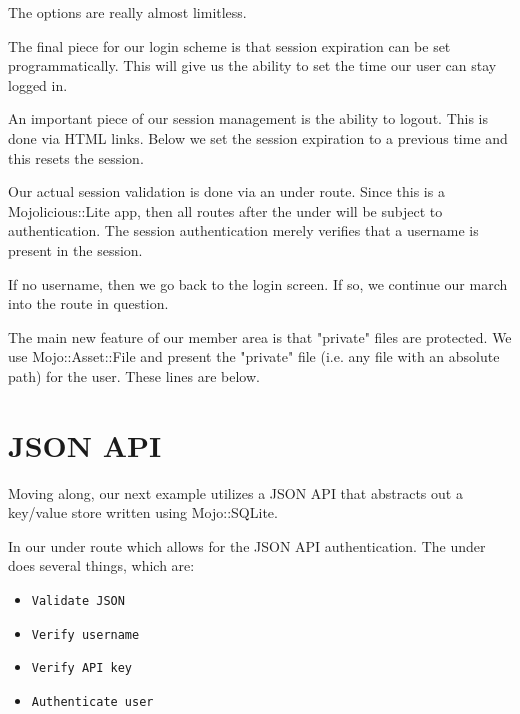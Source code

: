 \documentclass[14pt]{extreport}
\begin{document}
The options are really almost limitless.



The final piece for our login scheme is that session expiration can be set
programmatically.  This will give us the ability to set the time our user can
stay logged in.

An important piece of our session management is the ability to logout.  This is
done via HTML links.  Below we set the session expiration to a previous time
and this resets the session.



Our actual session validation is done via an under route.  Since this is a
Mojolicious::Lite app, then all routes after the under will be subject to
authentication.  The session authentication merely verifies that a username is
present in the session.

If no username, then we go back to the login screen.  If so, we continue our
march into the route in question.



The main new feature of our member area is that "private" files are protected.
We use Mojo::Asset::File and present the "private" file (i.e. any file with an
absolute path) for the user.  These lines are below.



\section{JSON API}

Moving along, our next example utilizes a JSON API that abstracts out a
key/value store written using Mojo::SQLite.

In our under route which allows for the JSON API authentication.  The under
does several things, which are:

\begin{itemize} \itemsep1pt \parskip0pt 
\item \verb|Validate JSON|
\item \verb|Verify username|
\item \verb|Verify API key|
\item \verb|Authenticate user|
\end{itemize}
\end{document}
